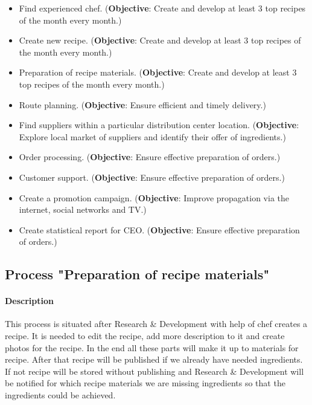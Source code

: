 \documentclass[11pt,a4paper]{article}
\begin{document}
\begin{itemize}
    \item Find experienced chef. (\textbf{Objective}: Create and develop at least 3 top recipes of the month every month.)
    \item Create new recipe. (\textbf{Objective}: Create and develop at least 3 top recipes of the month every month.)
    \item Preparation of recipe materials. (\textbf{Objective}: Create and develop at least 3 top recipes of the month every month.)
    \item Route planning. (\textbf{Objective}: Ensure efficient and timely delivery.)
    \item Find suppliers within a particular distribution center location. (\textbf{Objective}: Explore local market of suppliers and identify their offer of ingredients.)
    \item Order processing. (\textbf{Objective}: Ensure effective preparation of orders.)
    \item Customer support. (\textbf{Objective}: Ensure effective preparation of orders.)
    \item Create a promotion campaign. (\textbf{Objective}: Improve propagation via the internet, social networks and TV.)
    \item Create statistical report for CEO. (\textbf{Objective}: Ensure effective preparation of orders.)
\end{itemize}

\newpage


\subsection{Process "Preparation of recipe materials"}

\paragraph{Description}

This process is situated after Research \& Development with help of chef creates a recipe. It is needed to edit the recipe, add more description to it and create photos for the recipe. In the end all these parts will make it up to materials for recipe. After that recipe will be published if we already have needed ingredients. If not recipe will be stored without publishing and Research \& Development will be notified for which recipe materials we are missing ingredients so that the ingredients could be achieved.
\end{document}
